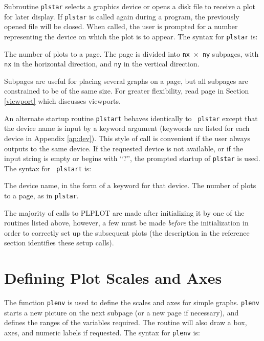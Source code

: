Subroutine {\tt plstar} selects a graphics device or opens a disk file to
receive a plot for later display. If {\tt plstar} is called again during
a program, the previously opened file will be closed. When called, 
the user is prompted for a number representing the device on which
the plot is to appear. The syntax for {\tt plstar} is:

{The number of plots to a page. The page is divided into
{\tt nx}~$\times$~{\tt ny} subpages, with {\tt nx} in the horizontal
direction, and {\tt ny} in the vertical direction.}

Subpages are useful for placing several graphs on a page, but all
subpages are constrained to be of the same size. For greater flexibility, 
read page \pageref{viewport} in Section
\ref{viewport} which discusses viewports.

An alternate startup routine {\tt plstart} behaves identically to {\tt
plstar} except that the device name is input by a keyword argument (keywords
are listed for each device in Appendix \ref{ap:dev}).  This style of call is
convenient if the user always outputs to the same device.  If the requested
device is not available, or if the input string is empty or begins with
``?'', the prompted startup of {\tt plstar} is used.  The syntax for {\tt
plstart} is:

{The device name, in the form of a keyword for that device.}
{The number of plots to a page, as in {\tt plstar}.}

The majority of calls to PLPLOT are made after initializing it by one of the
routines listed above, however, a few must be made {\em before\/} the
initialization in order to correctly set up the subsequent plots (the
description in the reference section identifies these setup calls).


\section{Defining Plot Scales and Axes}

The function {\tt plenv} is used to define the scales and axes for simple
graphs. {\tt plenv} starts a new picture on the next subpage (or a new page
if necessary), and defines the ranges of the variables required. The
routine will also draw a box, axes, and numeric labels if requested.
The syntax for {\tt plenv} is:

